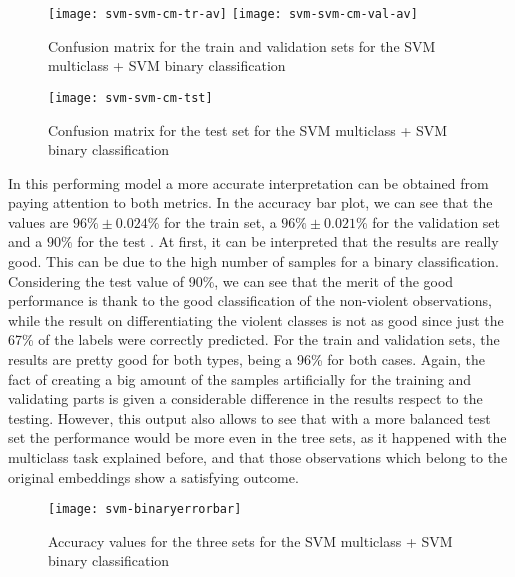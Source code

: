 	\begin{figure}[H]
		\hspace*{-2cm}
		\centering
		\captionsetup{justification=centering}
		\texttt{[image: svm-svm-cm-tr-av]}%
		\texttt{[image: svm-svm-cm-val-av]}
		\caption{Confusion matrix for the train and validation sets for the SVM multiclass + SVM binary classification}
		\label{fig:mesh23}
	\end{figure}
	
	\begin{figure}[H]
		\centering
		\captionsetup{justification=centering}
		\texttt{[image: svm-svm-cm-tst]}
		\caption{Confusion matrix for the test set for the SVM multiclass + SVM binary classification}
		\label{fig:mesh24}
	\end{figure}

	In this performing model a more accurate interpretation can be obtained from paying attention to both metrics. In the accuracy bar plot, we can see that the values are $96\% \pm 0.024\%$ for the train set, a $96\% \pm 0.021\%$ for the validation set and a $90\%$ for the test . At first, it can be interpreted that the results are really good. This can be due to the high number of samples for a binary classification. Considering the test value of 90\%, we can see that the merit of the good performance is thank to the good classification of the non-violent observations, while the result on differentiating the violent classes is not as good since just the 67\% of the labels were correctly predicted. For the train and validation sets, the results are pretty good for both types, being a 96\% for both cases. Again, the fact of creating a big amount of the samples artificially for the training and validating parts is given a considerable difference in the results respect to the testing. However, this output also allows to see that with a more balanced test set the performance would be more even in the tree sets, as it happened with the multiclass task explained before, and that those observations which belong to the original embeddings show a satisfying outcome.

	\begin{figure}[H]
		\centering
		\captionsetup{justification=centering}
		\texttt{[image: svm-binaryerrorbar]}
		\caption{Accuracy values for the three sets for the SVM multiclass + SVM binary classification}
		\label{fig:mesh25}
	\end{figure}

